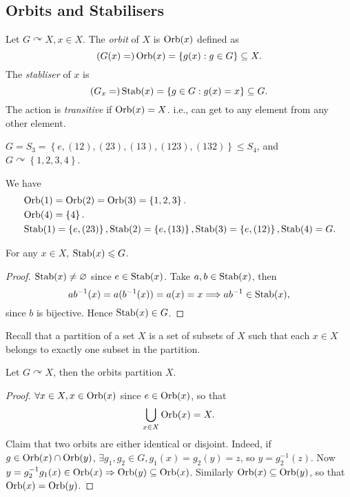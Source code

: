 \documentclass[a4paper]{article}
\begin{document}
\subsection{Orbits and Stabilisers}
\begin{definition}
  Let $ G \curvearrowright X, x\in X $. The \textit{orbit} of $X$ is
  $ \operatorname{Orb}(x) $ defined as
  \[
    (G(x)=)\operatorname{Orb}(x)=\left\{ g(x):g\in G\right\} \subseteq X
  .\]
  The \textit{stabliser} of $x$ is
  \[
    (G_x=)\operatorname{Stab}(x)=\left\{ g\in G: g(x)=x\right\} \subseteq G
  .\]
  The action is \textit{transitive} if $ \operatorname{Orb}(x)=X $. i.e., can get
  to any element from any other element.
\end{definition}
\begin{example}
  $ G=S_3=\left\{ e,(12),(23),(13),(123),(132)\right\}\le S_4 $, and
  $ G \curvearrowright \left\{ 1,2,3,4\right\} $.

  We have
  \[
    \begin{aligned}
      &\operatorname{Orb}(1)=\operatorname{Orb}(2)=\operatorname{Orb}(3)=\left\{ 1,2,3\right\}.\\
      &\operatorname{Orb}(4)=\left\{ 4\right\}.\\
      &\operatorname{Stab}(1)=\left\{ e,(23)\right\},
      \operatorname{Stab}(2)=\left\{ e,(13)\right\},
      \operatorname{Stab}(3)=\left\{ e,(12)\right\},
      \operatorname{Stab}(4)=G.
    \end{aligned}
  \]
\end{example}
\begin{lemma}\label{lma:5.9}
  For any $ x\in X $, $ \operatorname{Stab}(x) \leqslant G$.
\end{lemma}
\begin{proof}
  $ \operatorname{Stab}(x)\neq \varnothing $ since $ e\in \operatorname{Stab}(x) $. Take $ a,b\in
  \operatorname{Stab}(x) $, then
  \[
    ab^{-1}(x)=a(b^{-1}(x))=a(x)=x \Longrightarrow ab^{-1}\in \operatorname{Stab}(x)
  ,\]
  since $b$ is bijective. Hence $ \operatorname{Stab}(x)\in G $.
\end{proof}
Recall that a partition of a set $X$ is a set of subsets of $X$ such
that each $x\in X$ belongs to exactly one subset in the partition.
\begin{lemma}\label{lma:5.10}
  Let $ G \curvearrowright X $, then the orbits partition $X$.
\end{lemma}
\begin{proof}
  $ \forall x\in X, x\in \operatorname{Orb}(x) $ since $e\in\operatorname{Orb}(x)$, so that
  \[
    \bigcup_{x\in X}\operatorname{Orb}(x)=X
  .\]
  Claim that two orbits are either identical or disjoint. Indeed, if
  $ g\in \operatorname{Orb}(x)\cap \operatorname{Orb}(y) $, $ \exists g_1,g_2\in G,
  g_1(x)=g_2(y)=z $, so $ y=g_2^{-1}(z) $. Now $ y=g_2^{-1}g_1(x)\in
  \operatorname{Orb}(x) \Rightarrow \operatorname{Orb}(y)\subseteq \operatorname{Orb}(x) $. Similarly $ \operatorname{Orb}(x)
  \subseteq \operatorname{Orb}(y) $, so that $ \operatorname{Orb}(x)=\operatorname{Orb}(y) $.
\end{proof}
\end{document}
